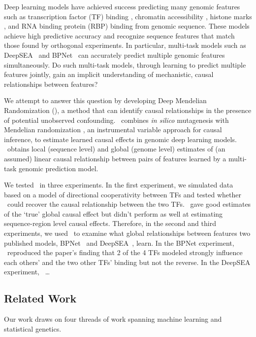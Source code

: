 Deep learning models have achieved success predicting many genomic features such as transcription factor (TF) binding \citep{alipanahi2015predicting, zhou2015predicting}, chromatin accessibility \citep{zhou2015predicting, kelley2016basset}, histone marks \citep{yin2019deephistone}, and RNA binding protein (RBP) binding \citep{alipanahi2015predicting, pan2017rna, gandhi2018cdeepbind, zheng2018deep} from genomic sequence. These models achieve high predictive accuracy and recognize sequence features that match those found by orthogonal experiments. In particular, multi-task models such as DeepSEA~\citep{zhou2015predicting} and BPNet~\citep{avsec2020base} can accurately predict multiple genomic features simultaneously. Do such multi-task models, through learning to predict multiple features jointly, gain an implicit understanding of mechanistic, causal relationships between features?

We attempt to answer this question by developing Deep Mendelian Randomization (\method), a method that can identify causal relationships in the presence of potential unobserved confounding. \method\ combines \textit{in silico} mutagenesis with Mendelian randomization \citep{lawlor2008mendelian}, an instrumental variable approach for causal inference, to estimate learned causal effects in genomic deep learning models. \method\ obtains local (sequence level) and global (genome level) estimates of (an assumed) linear causal relationship between pairs of features learned by a multi-task genomic prediction model.

We tested \method\ in three experiments. In the first experiment, we simulated data based on a model of directional cooperativity between TFs and tested whether \method\ could recover the causal relationship between the two TFs. \method\ gave good estimates of the `true' global causal effect but didn't perform as well at estimating sequence-region level causal effects. Therefore, in the second and third experiments, we used \method\ to examine what global relationships between features two published models, BPNet~\citep{avsec2020base} and DeepSEA~\citep{zhou2015predicting}, learn. In the BPNet experiment, \method\ reproduced the paper's finding that 2 of the 4 TFs modeled strongly influence each others' and the two other TFs' binding but not the reverse. In the DeepSEA experiment, \method\ \dots

\subsection{Related Work}
Our work draws on four threads of work spanning machine learning and statistical genetics.

